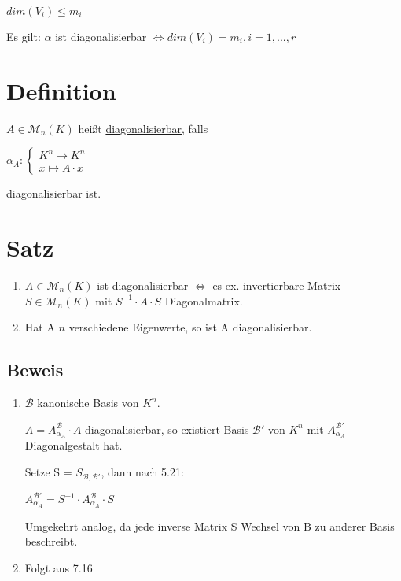 \documentclass[a4paper, openany]{book}
\begin{document}
        \begin{center}
          $dim(V_i) \le m_i$
        \end{center}

        Es gilt: $\alpha$ ist diagonalisierbar $\Leftrightarrow dim(V_i) = m_i, i =1, ..., r$

        \section{Definition}

        $A \in \mathcal{M}_n(K)$ heißt \underline{diagonalisierbar}, falls

        \begin{center}
          $\alpha_A : \begin{cases}K^n \rightarrow K^n \\ x \mapsto A \cdot x \end{cases}$  
        \end{center}

        diagonalisierbar ist.

        \section{Satz}

        \begin{enumerate}[label=(\alph*)]
          \item $A \in \mathcal{M}_n(K)$ ist diagonalisierbar $\Leftrightarrow$ es ex. invertierbare Matrix $S \in \mathcal{M}_n(K)$ mit $S^{-1} \cdot A \cdot S$ Diagonalmatrix.

          \item Hat A $n$ verschiedene Eigenwerte, so ist A diagonalisierbar.
        \end{enumerate}

        \subsection{Beweis}

        \begin{enumerate}[label=(\alph*)]
          \item $\mathcal{B}$ kanonische Basis von $K^n$.

          $A = A_{\alpha_A}^{\mathcal{B}} \cdot A$ diagonalisierbar, so existiert Basis $\mathcal{B'}$ von $K^n$ mit $A_{\alpha_A}^{\mathcal{B'}}$ Diagonalgestalt hat.

          Setze S = $S_{\mathcal{B, B'}}$, dann nach 5.21:

          \begin{center}
            $A_{\alpha_A}^{\mathcal{B'}} = S^{-1} \cdot A_{\alpha_A}^{\mathcal{B}} \cdot S$
          \end{center}

          Umgekehrt analog, da jede inverse Matrix S Wechsel von B zu anderer Basis beschreibt.

          \item Folgt aus 7.16
        \end{enumerate}
\end{document}
